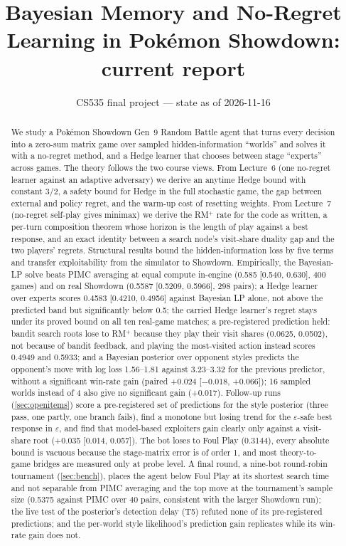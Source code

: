 \documentclass[10pt]{article}
\title{Bayesian Memory and No-Regret Learning in Pok\'emon Showdown:\\ current report}
\author{CS535 final project --- state as of 2026-11-16}
\date{}
\theoremstyle{plain}
\theoremstyle{definition}
\theoremstyle{remark}
\begin{document}
\maketitle
\vspace{-1.8em}

\begin{abstract}
We study a Pok\'emon Showdown Gen~9 Random Battle agent that turns every decision into a zero-sum matrix game over
sampled hidden-information ``worlds'' and solves it with a no-regret method, and a Hedge learner that chooses between
stage ``experts'' across games. The theory follows the two course views. From Lecture~6 (one no-regret learner against
an adaptive adversary) we derive an anytime Hedge bound with constant $3/2$, a safety bound for Hedge in the full
stochastic game, the gap between external and policy regret, and the warm-up cost of resetting weights. From Lecture~7
(no-regret self-play gives minimax) we derive the RM$^+$ rate for the code as written, a per-turn composition theorem
whose horizon is the length of play against a best response, and an exact identity between a search node's
visit-share duality gap and the two players' regrets. Structural results bound the hidden-information loss by five terms
and transfer exploitability from the simulator to Showdown. Empirically, the Bayesian-LP solve beats PIMC averaging at
equal compute in-engine (0.585 [0.540, 0.630], 400 games) and on real Showdown (0.5587 [0.5209, 0.5966], 298 pairs);
a Hedge learner over experts scores 0.4583 [0.4210, 0.4956] against Bayesian LP alone, not above the predicted band but
significantly below 0.5; the carried Hedge learner's regret stays under its proved bound on all ten real-game matches;
a pre-registered prediction held: bandit search roots lose to RM$^+$ because they play their visit shares (0.0625,
0.0502), not because of bandit feedback, and playing the most-visited action instead scores 0.4949 and 0.5933; and
a Bayesian posterior over opponent styles predicts the opponent's move with log loss 1.56--1.81 against 3.23--3.32 for
the previous predictor, without a significant win-rate gain (paired +0.024 [$-0.018$, +0.066]); 16 sampled worlds instead of 4 also give no significant gain (+0.017).
Follow-up runs (\cref{sec:openitems}) score a pre-registered set of predictions for the style posterior (three pass,
one partly, one branch fails), find a monotone but losing trend for the $\varepsilon$-safe best response in $\varepsilon$, and find that
model-based exploiters gain clearly only against a visit-share root (+0.035 [0.014, 0.057]).
The bot loses to Foul Play (0.3144), every absolute bound is vacuous because the stage-matrix
error is of order 1, and most theory-to-game bridges are measured only at probe level.
A final round, a nine-bot round-robin tournament (\cref{sec:bench}), places the agent below Foul Play at its shortest search time and not separable from PIMC averaging and the top move at the tournament's sample size (0.5375 against PIMC over 40 pairs, consistent with the larger Showdown run); the live test of the posterior's detection delay (T5) refuted none of its pre-registered predictions; and the per-world style likelihood's prediction gain replicates while its win-rate gain does not.
\end{abstract}
\end{document}
